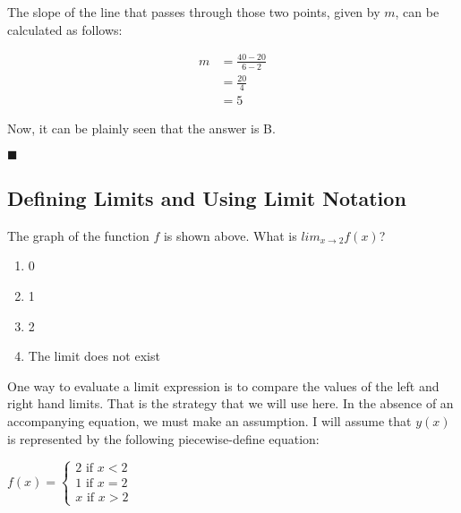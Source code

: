\documentclass{article}
\begin{document}
The slope of the line that passes through those two points, given by $m$, can
be calculated as follows:

\begin{align}
    m &= \frac{40 - 20}{6 - 2} \\
      &= \frac{20}{4} \\
      &= 5
\end{align}

Now, it can be plainly seen that the answer is B.

$\blacksquare$

\subsection{Defining Limits and Using Limit Notation}


The graph of the function $f$ is shown above. What is $lim_{x \to 2} f(x)$?

\begin{enumerate}[label=\Alph*]
    \item 0
    \item 1
    \item 2
    \item The limit does not exist
\end{enumerate}

One way to evaluate a limit expression is to compare the values of the left and
right hand limits. That is the strategy that we will use here. In the absence
of an accompanying equation, we must make an assumption. I will assume that
$y(x)$ is represented by the following piecewise-define equation:

\begin{math}
    f(x) = \begin{cases}
        2 \text{ if } x < 2 \\
        1 \text{ if } x = 2 \\
        x \text{ if } x > 2
    \end{cases}
\end{math}
\end{document}

